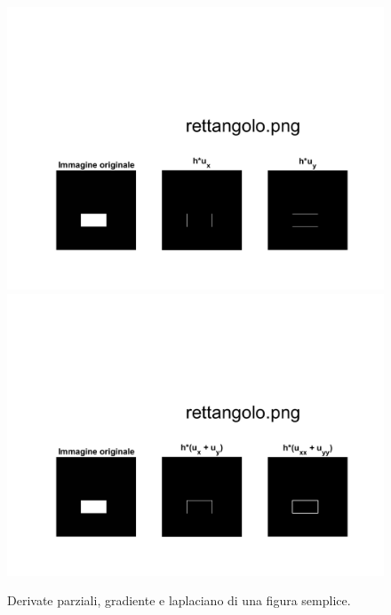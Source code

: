 \newpage
\begin{figure}[htb] 
\centering
\includegraphics[scale=0.4, trim = 0 0 0 10.5cm, clip]{Pictures/Risultati/rettangolo bianco e nero derivate parziali.png}
\includegraphics[scale=0.4, trim = 0 0 0 10.5cm, clip]{Pictures/Risultati/rettangolo bianco e nero gradiente e laplaciano.png}
\caption{Derivate parziali, gradiente e laplaciano di una figura semplice.}\label{fig:figura}
\end{figure}

